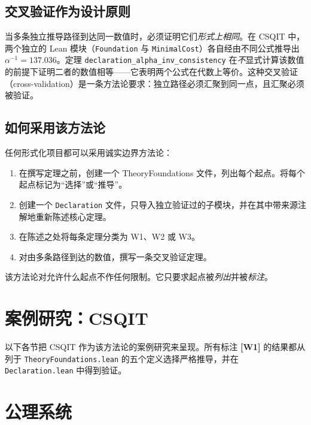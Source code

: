 \documentclass[11pt]{ctexart}
\newcommand{\wone}[1]{\textcolor{wcolor}{\textbf{[#1]}}}
\begin{document}
\subsection{交叉验证作为设计原则}
当多条独立推导路径到达同一数值时，必须证明它们\emph{形式上相同}。在 CSQIT 中，两个独立的 Lean 模块（\texttt{Foundation} 与 \texttt{MinimalCost}）各自经由不同公式推导出 $\alpha^{-1} = 137.036$。定理 \texttt{declaration\_alpha\_inv\_consistency} 在\emph{不}显式计算该数值的前提下证明二者的数值相等——它表明两个公式在代数上等价。这种交叉验证（cross-validation）是一条方法论要求：独立路径必须汇聚到同一点，且汇聚必须被验证。

\subsection{如何采用该方法论}
任何形式化项目都可以采用诚实边界方法论：
\begin{enumerate}
\item 在撰写定理之前，创建一个 TheoryFoundations 文件，列出每个起点。将每个起点标记为“选择”或“推导”。
\item 创建一个 \texttt{Declaration} 文件，只导入独立验证过的子模块，并在其中带来源注解地重新陈述核心定理。
\item 在陈述之处将每条定理分类为 W1、W2 或 W3。
\item 对由多条路径到达的数值，撰写一条交叉验证定理。
\end{enumerate}
该方法论对允许什么起点不作任何限制。它只要求起点被\emph{列出}并被\emph{标注}。

\section*{案例研究：CSQIT}
\label{sec:casestudy}

以下各节把 CSQIT 作为该方法论的案例研究来呈现。所有标注 \wone{W1} 的结果都从列于 \texttt{TheoryFoundations.lean} 的五个定义选择严格推导，并在 \texttt{Declaration.lean} 中得到验证。

\section{公理系统}
\label{sec:axioms}
\end{document}
